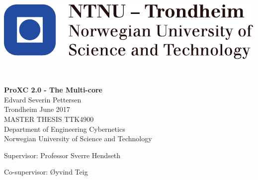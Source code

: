 
\thispagestyle{empty}

\begin{center}
\includegraphics{fig/NTNU}
\end{center}

\mbox{}\\[6pc]
\begin{center}
\Huge\textbf{ProXC 2.0 - The Multi-core}\\[2pc]

\Large{Edvard Severin Pettersen}\\[1pc]
\large{Trondheim June 2017}\\[2pc]

MASTER THESIS TTK4900\\
Department of Engineering Cybernetics\\
Norwegian University of Science and Technology
\end{center}
\vfill

\noindent Supervisor: Professor Sverre Hendseth

\noindent Co-supervisor: Øyvind Teig

\afterpage{\blankpage}

